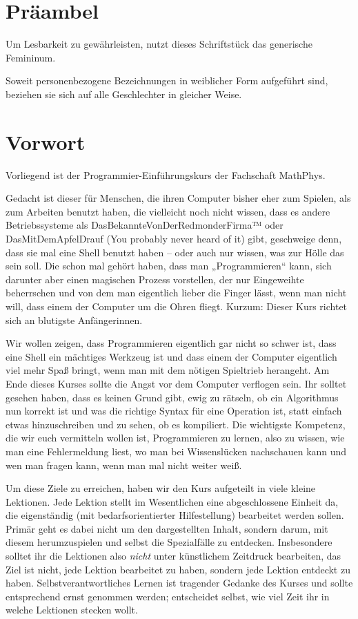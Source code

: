 \documentclass{vorkurs}
\begin{document}

\chapter{Präambel}
Um Lesbarkeit zu gewährleisten, nutzt dieses Schriftstück das generische
Femininum.

Soweit personenbezogene Bezeichnungen in weiblicher Form aufgeführt sind,
beziehen sie sich auf alle Geschlechter in gleicher Weise.

\clearpage

\chapter{Vorwort}
\pagestyle{empty}

Vorliegend ist der Programmier-Einführungskurs der Fachschaft MathPhys.

Gedacht ist dieser für Menschen, die ihren Computer bisher eher zum Spielen,
als zum Arbeiten benutzt haben, die vielleicht noch nicht wissen, dass es
andere Betriebssysteme als DasBekannteVonDerRedmonderFirma™ oder
DasMitDemApfelDrauf (You probably never heard of it) gibt, geschweige denn,
dass sie mal eine Shell benutzt haben -- oder auch nur wissen, was zur Hölle das
sein soll.  Die schon mal gehört haben, dass man „Programmieren“ kann, sich
darunter aber einen magischen Prozess vorstellen, der nur Eingeweihte
beherrschen und von dem man eigentlich lieber die Finger lässt, wenn man nicht
will, dass einem der Computer um die Ohren fliegt.  Kurzum: Dieser Kurs richtet
sich an blutigste Anfängerinnen.

Wir wollen zeigen, dass Programmieren eigentlich gar nicht so schwer ist, dass
eine Shell ein mächtiges Werkzeug ist und dass einem der Computer eigentlich
viel mehr Spaß bringt, wenn man mit dem nötigen Spieltrieb herangeht.  Am Ende
dieses Kurses sollte die Angst vor dem Computer verflogen sein. Ihr solltet
gesehen haben, dass es keinen Grund gibt, ewig zu rätseln, ob ein Algorithmus
nun korrekt ist und was die richtige Syntax für eine Operation ist, statt
einfach etwas hinzuschreiben und zu sehen, ob es kompiliert.  Die wichtigste
Kompetenz, die wir euch vermitteln wollen ist, Programmieren zu lernen, also zu
wissen, wie man eine Fehlermeldung liest, wo man bei Wissenslücken nachschauen
kann und wen man fragen kann, wenn man mal nicht weiter weiß.

Um diese Ziele zu erreichen, haben wir den Kurs aufgeteilt in viele kleine
Lektionen. Jede Lektion stellt im Wesentlichen eine abgeschlossene Einheit da,
die eigenständig (mit bedarfsorientierter Hilfestellung) bearbeitet werden
sollen. Primär geht es dabei nicht um den dargestellten Inhalt, sondern darum,
mit diesem herumzuspielen und selbst die Spezialfälle zu entdecken.
Insbesondere solltet ihr die Lektionen also \emph{nicht} unter künstlichem
Zeitdruck bearbeiten, das Ziel ist nicht, jede Lektion bearbeitet zu haben,
sondern jede Lektion entdeckt zu haben.  Selbstverantwortliches Lernen ist
tragender Gedanke des Kurses und sollte entsprechend ernst genommen werden;
entscheidet selbst, wie viel Zeit ihr in welche Lektionen stecken wollt.
\end{document}
